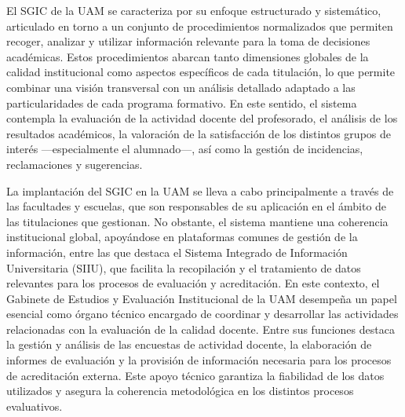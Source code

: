 \documentclass[
  11pt,
  a4paper,
  twoside]{scrreprt}
\begin{document}
El SGIC de la UAM se caracteriza por su enfoque estructurado y
sistemático, articulado en torno a un conjunto de procedimientos
normalizados que permiten recoger, analizar y utilizar información
relevante para la toma de decisiones académicas. Estos procedimientos
abarcan tanto dimensiones globales de la calidad institucional como
aspectos específicos de cada titulación, lo que permite combinar una
visión transversal con un análisis detallado adaptado a las
particularidades de cada programa formativo. En este sentido, el sistema
contempla la evaluación de la actividad docente del profesorado, el
análisis de los resultados académicos, la valoración de la satisfacción
de los distintos grupos de interés ---especialmente el alumnado---, así
como la gestión de incidencias, reclamaciones y sugerencias.

La implantación del SGIC en la UAM se lleva a cabo principalmente a
través de las facultades y escuelas, que son responsables de su
aplicación en el ámbito de las titulaciones que gestionan. No obstante,
el sistema mantiene una coherencia institucional global, apoyándose en
plataformas comunes de gestión de la información, entre las que destaca
el Sistema Integrado de Información Universitaria (SIIU), que facilita
la recopilación y el tratamiento de datos relevantes para los procesos
de evaluación y acreditación. En este contexto, el Gabinete de Estudios
y Evaluación Institucional de la UAM desempeña un papel esencial como
órgano técnico encargado de coordinar y desarrollar las actividades
relacionadas con la evaluación de la calidad docente. Entre sus
funciones destaca la gestión y análisis de las encuestas de actividad
docente, la elaboración de informes de evaluación y la provisión de
información necesaria para los procesos de acreditación externa. Este
apoyo técnico garantiza la fiabilidad de los datos utilizados y asegura
la coherencia metodológica en los distintos procesos evaluativos.
\end{document}
